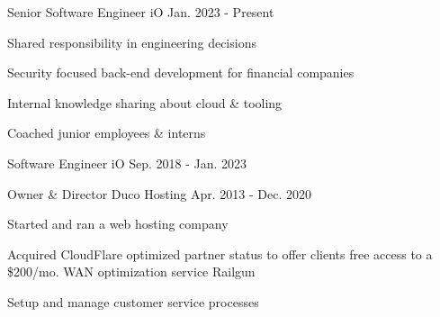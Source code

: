 

\begin{cventries}

  \cventry
    {Senior Software Engineer} %
    {iO} %
    {} %
    {Jan. 2023 - Present} %
    {
      \begin{cvitems} %
      	\item {Shared responsibility in engineering decisions}
      	\item {Security focused back-end development for financial companies}
      	\item {Internal knowledge sharing about cloud \& tooling}
      	\item {Coached junior employees \& interns}
      \end{cvitems}
    }

  \cventry
    {Software Engineer} %
    {iO} %
    {} %
    {Sep. 2018 - Jan. 2023} %
    {
    }

  \cventry
    {Owner \& Director} %
    {Duco Hosting} %
    {} %
    {Apr. 2013 - Dec. 2020} %
    {
      \begin{cvitems} %
        \item {Started and ran a web hosting company}
        \item {Acquired CloudFlare optimized partner status to offer clients free access to a \$200/mo. WAN optimization service Railgun}
        \item {Setup and manage customer service processes}
      \end{cvitems}
    }

\end{cventries}
